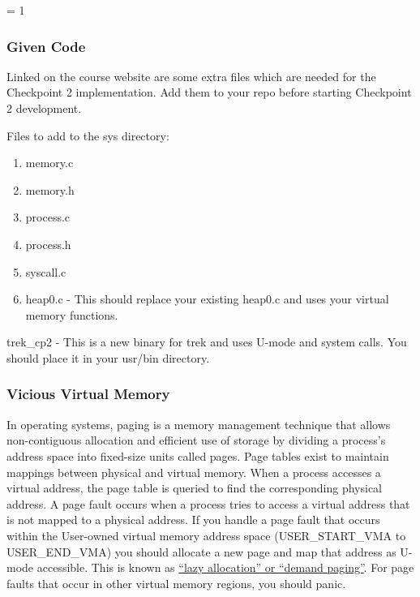 \documentclass{article}
\begin{document}
\else
\fi


\ifnum\rendercpii = 1

	\subsubsection{Given Code}
	Linked on the course website are some extra files which are needed for the Checkpoint 2 implementation. 
	Add them to your repo before starting Checkpoint 2 development.

	Files to add to the {\fix sys} directory:
	\begin{enumerate}
		\item{{\fix memory.c}}
		\item{{\fix memory.h}}
		\item{{\fix process.c}}
		\item{{\fix process.h}}
		\item{{\fix syscall.c}}
        \item{\fix heap0.c} - This should replace your existing {\fix heap0.c} and uses your virtual memory functions.
	\end{enumerate}
	
	{\fix trek\_cp2} - This is a new binary for trek and uses U-mode and system calls. You should place it in your {\fix usr/bin} directory.
	
	\subsubsection{Vicious Virtual Memory}
	
	In operating systems, paging is a memory management technique that allows non-contiguous allocation and efficient use of storage 
	by dividing a process's address space into fixed-size units called pages. Page tables exist to maintain mappings between physical and virtual memory. 
	When a process accesses a virtual address, the page table is queried to find the corresponding physical address. A page fault occurs when a process tries 
	to access a virtual address that is not mapped to a physical address. If you handle a page fault that occurs within the User-owned virtual memory address space ({\fix USER\_START\_VMA} to {\fix USER\_END\_VMA})
    you should allocate a new page and map that address as U-mode accessible. This is known as \href{https://en.wikipedia.org/wiki/Demand_paging}{``lazy allocation'' or ``demand paging''}.
    For page faults that occur in other virtual memory regions, you should panic.
\end{document}
